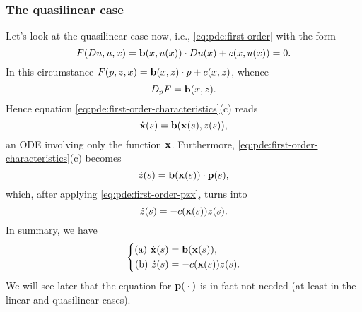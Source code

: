 \subsubsection{The quasilinear case}
Let's look at the quasilinear case now, i.e., \eqref{eq:pde:first-order}
with the form
\begin{equation}
  \label{eq:pde:first-order-quasilinear}
  F(Du,u,x)=\mathbf{b}(x,u(x))\cdot Du(x)+c(x,u(x))=0.
\end{equation}
In this circumstance \(F(p,z,x)=\mathbf{b}(x,z)\cdot p+c(x,z)\), whence
\[
  D_pF=\mathbf{b}(x,z).
\]
Hence equation \eqref{eq:pde:first-order-characteristics}(c) reads
\begin{equation}
  \label{eq:pde:first-order-quasilinear-dotx}
  \dot{\mathbf{x}}(s)=\mathbf{b}(\mathbf{x}(s),z(s)),
\end{equation}
an ODE involving only the function \(\mathbf{x}\). Furthermore,
\eqref{eq:pde:first-order-characteristics}(c) becomes
\begin{equation}
  \label{eq:pde:first-order-quasilinear-dotz}
  \dot z(s)=\mathbf{b}(\mathbf{x}(s))\cdot\mathbf{p}(s),
\end{equation}
which, after applying \eqref{eq:pde:first-order-pzx}, turns into
\begin{equation}
  \label{eq:pde:first-order-quasilinear-dotz-simp}
  \dot z(s)=-c(\mathbf{x}(s))z(s).
\end{equation}
In summary, we have
\begin{equation}
  \label{eq:pde:first-order-quasilinear-characteristics}
  \left\{
    \begin{aligned}
      \text{(a) }
      \dot{\mathbf{x}}(s)&=\mathbf{b}(\mathbf{x}(s)),
      \\
      \text{(b) }
      \dot z(s)&=-c(\mathbf{x}(s))z(s).
    \end{aligned}
  \right.
\end{equation}
We will see later that the equation for \(\mathbf{p}({}\cdot{})\) is in fact not
needed (at least in the linear and quasilinear cases).

